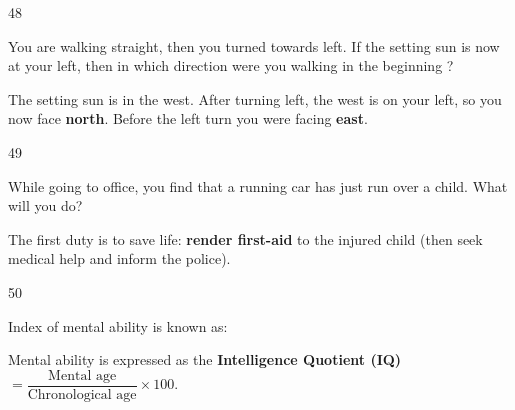 \begin{question}{48}
{You are walking straight, then you turned towards left. If the setting sun is now at your left, then in which direction were you walking in the beginning ?\par}
\begin{explain}
The setting sun is in the west. After turning left, the west is on your left, so you now face \textbf{north}. Before the left turn you were facing \textbf{east}.
\end{explain}
\end{question}

\begin{question}{49}
{While going to office, you find that a running car has just run over a child. What will you do?\par}
\begin{explain}
The first duty is to save life: \textbf{render first-aid} to the injured child (then seek medical help and inform the police).
\end{explain}
\end{question}

\begin{question}{50}
{Index of mental ability is known as:\par}
\begin{explain}
Mental ability is expressed as the \textbf{Intelligence Quotient (IQ)} $=\dfrac{\text{Mental age}}{\text{Chronological age}}\times100$.
\end{explain}
\end{question}
